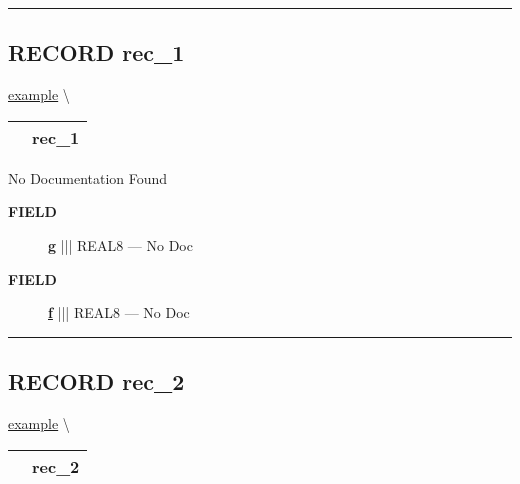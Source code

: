 \rule{\linewidth}{0.5pt}

\subsection*{\textsf{\colorbox{headtoc}{\color{white} RECORD}
rec\_1}}

\hypertarget{ecldoc:example.rec_1}{}
\hspace{0pt} \hyperlink{ecldoc:example}{example} \textbackslash 

{\renewcommand{\arraystretch}{1.5}
\begin{tabularx}{\textwidth}{|>{\raggedright\arraybackslash}l|X|}
\hline
\hspace{0pt}\mytexttt{\color{red} } & \textbf{rec\_1} \\
\hline
\end{tabularx}
}

\par





No Documentation Found







\par
\begin{description}
\item [\colorbox{tagtype}{\color{white} \textbf{\textsf{FIELD}}}] \textbf{\underline{g}} ||| REAL8 --- No Doc
\item [\colorbox{tagtype}{\color{white} \textbf{\textsf{FIELD}}}] \textbf{\underline{f}} ||| REAL8 --- No Doc
\end{description}





\rule{\linewidth}{0.5pt}
\subsection*{\textsf{\colorbox{headtoc}{\color{white} RECORD}
rec\_2}}

\hypertarget{ecldoc:example.rec_2}{}
\hspace{0pt} \hyperlink{ecldoc:example}{example} \textbackslash 

{\renewcommand{\arraystretch}{1.5}
\begin{tabularx}{\textwidth}{|>{\raggedright\arraybackslash}l|X|}
\hline
\hspace{0pt}\mytexttt{\color{red} } & \textbf{rec\_2} \\
\hline
\end{tabularx}
}

